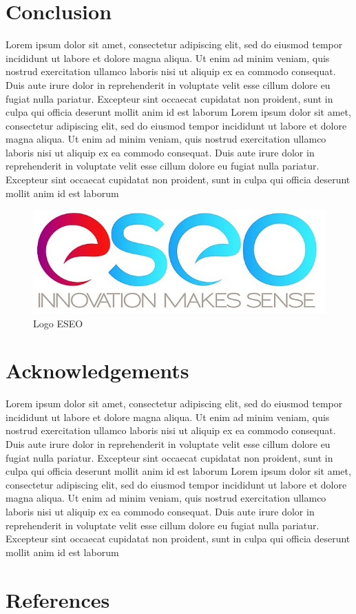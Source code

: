 \documentclass[twoside,twocolumn]{article}                          %
\begin{document}
\section{Conclusion}
Lorem ipsum dolor sit amet, consectetur adipiscing elit, sed do eiusmod tempor incididunt ut labore et dolore magna aliqua. Ut enim ad minim veniam, quis nostrud exercitation ullamco laboris nisi ut aliquip ex ea commodo consequat. Duis aute irure dolor in reprehenderit in voluptate velit esse cillum dolore eu fugiat nulla pariatur. Excepteur sint occaecat cupidatat non proident, sunt in culpa qui officia deserunt mollit anim id est laborum
Lorem ipsum dolor sit amet, consectetur adipiscing elit, sed do eiusmod tempor incididunt ut labore et dolore magna aliqua. Ut enim ad minim veniam, quis nostrud exercitation ullamco laboris nisi ut aliquip ex ea commodo consequat. Duis aute irure dolor in reprehenderit in voluptate velit esse cillum dolore eu fugiat nulla pariatur. Excepteur sint occaecat cupidatat non proident, sunt in culpa qui officia deserunt mollit anim id est laborum
\cite{Demaine2007}

\begin{figure}[!h]
  \begin{center}
    \includegraphics[scale=0.2]{eseo.JPG}
  \end{center}
  \caption{Logo ESEO}
\end{figure}


\section{Acknowledgements}
Lorem ipsum dolor sit amet, consectetur adipiscing elit, sed do eiusmod tempor incididunt ut labore et dolore magna aliqua. Ut enim ad minim veniam, quis nostrud exercitation ullamco laboris nisi ut aliquip ex ea commodo consequat. Duis aute irure dolor in reprehenderit in voluptate velit esse cillum dolore eu fugiat nulla pariatur. Excepteur sint occaecat cupidatat non proident, sunt in culpa qui officia deserunt mollit anim id est laborum
Lorem ipsum dolor sit amet, consectetur adipiscing elit, sed do eiusmod tempor incididunt ut labore et dolore magna aliqua. Ut enim ad minim veniam, quis nostrud exercitation ullamco laboris nisi ut aliquip ex ea commodo consequat. Duis aute irure dolor in reprehenderit in voluptate velit esse cillum dolore eu fugiat nulla pariatur. Excepteur sint occaecat cupidatat non proident, sunt in culpa qui officia deserunt mollit anim id est laborum

\section{References}


\end{document}
